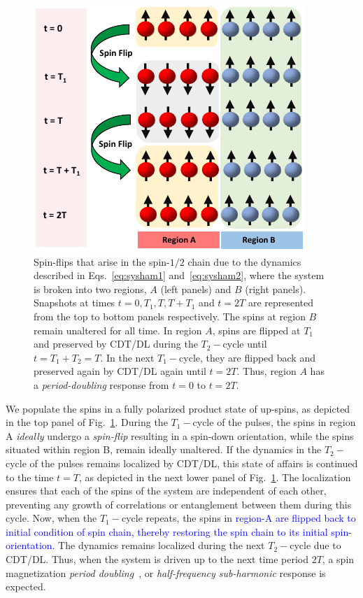 \documentclass[
nofootinbib,
reprint,
superscriptaddress,
amsmath,amssymb,showkeys,
aps,
prb,
]{revtex4-2}
\newcommand{\blue}[1]{\textcolor{blue}{#1}}
\begin{document}
	\begin{figure}[t!]
		\centering
		\includegraphics[width=7.cm]{pic_regions.pdf}
		\caption{Spin-flips that arise in the spin-$1/2$ chain due to the dynamics described in Eqs.~\ref{eq:sysham1} and~\ref{eq:sysham2}, where the system is broken into two regions, $A$ (left panels) and $B$ (right panels). Snapshots at times $t=0, T_1, T, T+T_1 $ and $t=2T$ are represented from the top to bottom panels respectively. The spins at region $B$ remain unaltered for all time. In region $A$, spins are flipped at $T_1$ and preserved by CDT/DL during the $T_2-$cycle until $t=T_1+T_2=T$. In the next $T_1-$cycle, they are flipped back and preserved again by CDT/DL again until $t=2T$. Thus, region $A$ has a \textit{period-doubling} response from $t=0$ to $t=2T$.}
		\label{Fig:spinflip}
	\end{figure}
	
	We populate the spins in a fully polarized product state of up-spins, as depicted in the top panel of Fig.~\ref{Fig:spinflip}. During the $T_1-$cycle of the pulses,  the spins in region A \textit{ideally} undergo a \textit{spin-flip} resulting in a spin-down orientation, while the spins situated within region B, remain ideally unaltered. If the dynamics in the $T_2-$cycle of the pulses remains localized by CDT/DL, this state of affairs is continued to the time $t=T$, as depicted in the next lower panel of Fig.~\ref{Fig:spinflip}. The localization ensures that each of the spins of the system are independent of each other, preventing any growth of correlations or entanglement between them during this cycle. Now, when the $T_1-$cycle repeats, the spins in \blue{region-A are flipped back to initial condition of spin chain, thereby restoring the spin chain to its initial spin-orientation.} The dynamics remains localized during the next $T_2-$cycle due to CDT/DL. Thus, when the system is driven up to the next time period $2T$, a spin magnetization \textit{period doubling}~\cite{rovny_31mathrmp_2018, Pan2020}, or \textit{half-frequency sub-harmonic} response is expected. 
	
\end{document}
